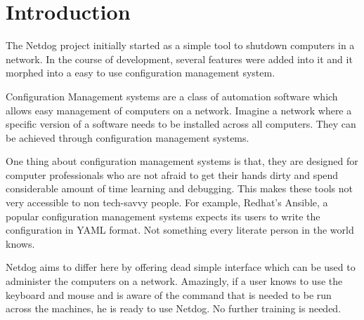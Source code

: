 \chapter{Introduction}
	
\par
The Netdog project initially started as a simple tool to shutdown computers in a
network. In the course of development, several features were added into it and
it morphed into a easy to use configuration management system.

\par
Configuration Management systems are a class of automation software which allows
easy management of computers on a network. Imagine a network where a specific
version of a software needs to be installed across all computers. They can be
achieved through configuration management systems.

\par
One thing about configuration management systems is that, they are designed for
computer professionals who are not afraid to get their hands dirty and spend
considerable amount of time learning and debugging. This makes these tools not
very accessible to non tech-savvy people. For example, Redhat's Ansible, a
popular configuration management systems expects its users to write the
configuration in YAML format. Not something every literate person in the world
knows.

\par
Netdog aims to differ here by offering dead simple interface which can be used
to administer the computers on a network. Amazingly, if a user knows to use the
keyboard and mouse and is aware of the command that is needed to be run across
the machines, he is ready to use Netdog. No further training is needed.


\newpage 

